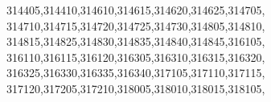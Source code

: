 \documentclass[
  12,
  dvipsnames]{article}
\newenvironment{Shaded}{\begin{snugshade}}{\end{snugshade}}
\newcommand{\NormalTok}[1]{#1}
\newcommand{\StringTok}[1]{\textcolor[rgb]{0.31,0.60,0.02}{#1}}
\begin{document}
\begin{Shaded}
\begin{Highlighting}[]
                  \StringTok{\textquotesingle{}314405\textquotesingle{}}\NormalTok{,}\StringTok{\textquotesingle{}314410\textquotesingle{}}\NormalTok{,}\StringTok{\textquotesingle{}314610\textquotesingle{}}\NormalTok{,}\StringTok{\textquotesingle{}314615\textquotesingle{}}\NormalTok{,}\StringTok{\textquotesingle{}314620\textquotesingle{}}\NormalTok{,}\StringTok{\textquotesingle{}314625\textquotesingle{}}\NormalTok{,}\StringTok{\textquotesingle{}314705\textquotesingle{}}\NormalTok{,}
                  \StringTok{\textquotesingle{}314710\textquotesingle{}}\NormalTok{,}\StringTok{\textquotesingle{}314715\textquotesingle{}}\NormalTok{,}\StringTok{\textquotesingle{}314720\textquotesingle{}}\NormalTok{,}\StringTok{\textquotesingle{}314725\textquotesingle{}}\NormalTok{,}\StringTok{\textquotesingle{}314730\textquotesingle{}}\NormalTok{,}\StringTok{\textquotesingle{}314805\textquotesingle{}}\NormalTok{,}\StringTok{\textquotesingle{}314810\textquotesingle{}}\NormalTok{,}
                  \StringTok{\textquotesingle{}314815\textquotesingle{}}\NormalTok{,}\StringTok{\textquotesingle{}314825\textquotesingle{}}\NormalTok{,}\StringTok{\textquotesingle{}314830\textquotesingle{}}\NormalTok{,}\StringTok{\textquotesingle{}314835\textquotesingle{}}\NormalTok{,}\StringTok{\textquotesingle{}314840\textquotesingle{}}\NormalTok{,}\StringTok{\textquotesingle{}314845\textquotesingle{}}\NormalTok{,}\StringTok{\textquotesingle{}316105\textquotesingle{}}\NormalTok{,}
                  \StringTok{\textquotesingle{}316110\textquotesingle{}}\NormalTok{,}\StringTok{\textquotesingle{}316115\textquotesingle{}}\NormalTok{,}\StringTok{\textquotesingle{}316120\textquotesingle{}}\NormalTok{,}\StringTok{\textquotesingle{}316305\textquotesingle{}}\NormalTok{,}\StringTok{\textquotesingle{}316310\textquotesingle{}}\NormalTok{,}\StringTok{\textquotesingle{}316315\textquotesingle{}}\NormalTok{,}\StringTok{\textquotesingle{}316320\textquotesingle{}}\NormalTok{,}
                  \StringTok{\textquotesingle{}316325\textquotesingle{}}\NormalTok{,}\StringTok{\textquotesingle{}316330\textquotesingle{}}\NormalTok{,}\StringTok{\textquotesingle{}316335\textquotesingle{}}\NormalTok{,}\StringTok{\textquotesingle{}316340\textquotesingle{}}\NormalTok{,}\StringTok{\textquotesingle{}317105\textquotesingle{}}\NormalTok{,}\StringTok{\textquotesingle{}317110\textquotesingle{}}\NormalTok{,}\StringTok{\textquotesingle{}317115\textquotesingle{}}\NormalTok{,}
                  \StringTok{\textquotesingle{}317120\textquotesingle{}}\NormalTok{,}\StringTok{\textquotesingle{}317205\textquotesingle{}}\NormalTok{,}\StringTok{\textquotesingle{}317210\textquotesingle{}}\NormalTok{,}\StringTok{\textquotesingle{}318005\textquotesingle{}}\NormalTok{,}\StringTok{\textquotesingle{}318010\textquotesingle{}}\NormalTok{,}\StringTok{\textquotesingle{}318015\textquotesingle{}}\NormalTok{,}\StringTok{\textquotesingle{}318105\textquotesingle{}}\NormalTok{,}

\end{Highlighting}
\end{Shaded}
\end{document}
